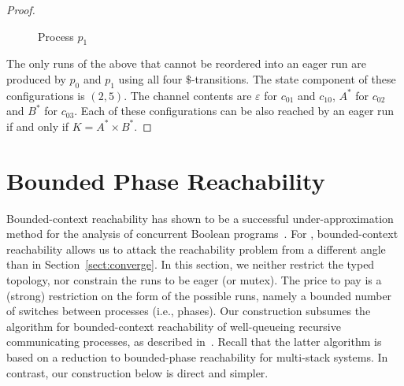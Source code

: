 \documentclass{LMCS}
\begin{document}
\begin{proof}
\begin{figure}
  \centering
{}
  \caption{Process $p_1$}
  \label{fig:P1}
\end{figure}

  The only runs of the above \qcp that cannot be reordered into an eager
  run are produced by $p_0$ and $p_1$ using all four
  $\mathtt{\$}$-transitions.  The state component of these
  configurations is $(2,5)$. The channel contents are
  $\varepsilon$ for $c_{01}$ and $c_{10}$, $A^*$ for $c_{02}$ and $B^*$ for
  $c_{03}$. Each of these configurations can be also reached by an
  eager run if and only if $K = A^* \times B^*$.
\end{proof}
 \section{Bounded Phase Reachability}
\label{sect:bounded}

Bounded-context reachability has shown to be a successful
under-approximation method for the analysis of concurrent
Boolean programs~\cite{qadeer-s-2005-93-a}. For \rqcp, bounded-context
reachability allows us to attack the reachability problem from a
different angle than in Section~\ref{sect:converge}.  In this section,
we neither restrict the typed topology, nor constrain the runs to be
eager (or mutex). The price to pay is a (strong) restriction on the
form of the possible runs, namely a bounded number of switches between
processes (i.e., phases). Our construction
subsumes the \twodexptime algorithm for bounded-context
reachability of well-queueing recursive communicating processes, as
described in~\cite{latorre-s-2008-299-a}. Recall that the latter
algorithm is based on a reduction to bounded-phase reachability for
multi-stack systems. In contrast, our construction below is direct and
simpler.
\end{document}
